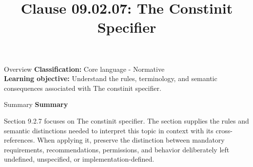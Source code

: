 \documentclass[10pt,letterpaper]{article}
\title{Clause 09.02.07: The Constinit Specifier}
\author{}
\date{}
\begin{document}
\maketitle
\begin{CornellOverviewBox}{Overview}
\textbf{Classification:} Core language - Normative\\[2pt]
\textbf{Learning objective:} Understand the rules, terminology, and semantic consequences associated with The constinit specifier.
\end{CornellOverviewBox}\begin{CornellSummaryBox}{Summary}
{\sffamily\bfseries\color{Accent} Summary}\par\vspace{3pt}Section 9.2.7 focuses on The constinit specifier. The section supplies the rules and semantic distinctions needed to interpret this topic in context with its cross-references. When applying it, preserve the distinction between mandatory requirements, recommendations, permissions, and behavior deliberately left undefined, unspecified, or implementation-defined.
\end{CornellSummaryBox}
\end{document}
